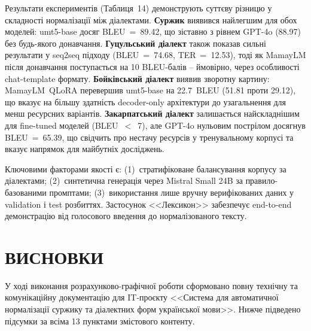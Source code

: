 \documentclass[14pt]{extarticle}
\begin{document}
Результати експериментів (Таблиця~14) демонструють суттєву різницю у складності нормалізації між діалектами. \textbf{Суржик} виявився найлегшим для обох моделей: umt5-base досяг BLEU~=~89.42, що зіставно з рівнем GPT-4o (88.97) без будь-якого донавчання. \textbf{Гуцульський діалект} також показав сильні результати у seq2seq підходу (BLEU~=~74.68, TER~=~12.53), тоді як MamayLM після донавчання поступається на 10 BLEU-балів -- ймовірно, через особливості chat-template формату. \textbf{Бойківський діалект} виявив зворотну картину: MamayLM~QLoRA перевершив umt5-base на 22.7~BLEU (51.81 проти 29.12), що вказує на більшу здатність decoder-only архітектури до узагальнення для менш ресурсних варіантів. \textbf{Закарпатський діалект} залишається найскладнішим для fine-tuned моделей (BLEU~$<$~7), але GPT-4o нульовим пострілом досягнув BLEU~=~65.39, що свідчить про нестачу ресурсів у тренувальному корпусі та вказує напрямок для майбутніх досліджень.

Ключовими факторами якості є: (1)~стратифіковане балансування корпусу за діалектами; (2)~синтетична генерація через Mistral Small 24B за правило-базованими промптами; (3)~використання лише вручну верифікованих даних у validation і test розбиттях. Застосунок <<Лексикон>> забезпечує end-to-end демонстрацію від голосового введення до нормалізованого тексту.

\clearpage

\section*{ВИСНОВКИ}

У ході виконання розрахунково-графічної роботи сформовано повну технічну та комунікаційну документацію для IT-проєкту <<Система для автоматичної нормалізації суржику та діалектних форм української мови>>. Нижче підведено підсумки за всіма 13 пунктами змістового контенту.
\end{document}
